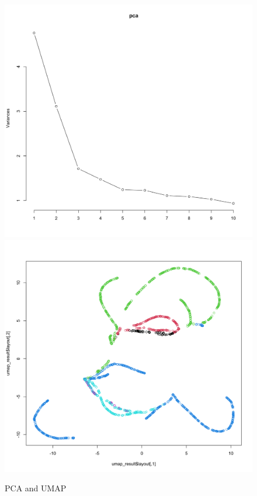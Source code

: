 \documentclass[8pt]{article}
\begin{document}
\begin{figure}[H]
    \centering
    \includegraphics*[scale=0.1]{figures/PCA.png}
    \includegraphics*[scale=0.1]{figures/UMAP_PAC2.png}
    \caption{PCA and UMAP}
    \label{fig:PCA_and_UMAP}
\end{figure}
\end{document}
